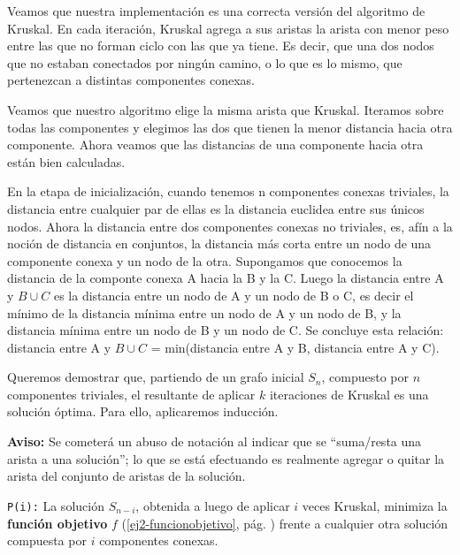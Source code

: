 \documentclass[11pt, a4paper, twoside]{article}
\begin{document}
{}

Veamos que nuestra implementación es una correcta versión del algoritmo de Kruskal. En cada iteración, Kruskal agrega a sus aristas la arista con menor peso
entre las que no forman ciclo con las que ya tiene. Es decir, que una dos nodos que no estaban conectados por ningún camino, o lo que es lo mismo, que pertenezcan a distintas componentes conexas.

Veamos que nuestro algoritmo elige la misma arista que Kruskal. Iteramos sobre todas las componentes y elegimos las dos que tienen la menor distancia hacia otra componente. Ahora veamos que las distancias de una componente hacia otra están bien calculadas.

En la etapa de inicialización, cuando tenemos n componentes conexas triviales, la distancia entre cualquier par de ellas es la distancia euclidea entre sus únicos nodos. Ahora la distancia entre dos componentes conexas no triviales, es, afín a la noción de distancia en conjuntos, la distancia más corta entre un nodo de una componente conexa y un nodo de la otra. Supongamos que conocemos la distancia de la componte conexa A hacia la B y la C. Luego la distancia entre A y $B \cup C$ es la distancia entre un nodo de A y un nodo de B o C, es decir el mínimo de la distancia mínima entre un nodo de A y un nodo de B, y la distancia mínima entre un nodo de B y un nodo de C. Se concluye esta relación: distancia entre A y $B \cup C$ = min(distancia entre A y B, distancia entre A y C).




Queremos demostrar que, partiendo de un grafo inicial $S_{n}$, compuesto por $n$ componentes
triviales, el resultante de aplicar $k$ iteraciones de Kruskal es una solución óptima. 
Para ello, aplicaremos inducción.

\textbf{Aviso:} Se cometerá un abuso de notación al indicar que se
``suma/resta una arista a una solución''; lo que se está efectuando es
realmente agregar o quitar la arista del conjunto de aristas de la solución.

\texttt{P(i):} La solución $S_{n-i}$, obtenida a luego de aplicar $i$ veces Kruskal,
minimiza la \textbf{función objetivo} $f$
(\ref{ej2-funcionobjetivo}, pág. \pageref{ej2-funcionobjetivo})
frente a cualquier otra solución compuesta por $i$ componentes conexas.
\end{document}
